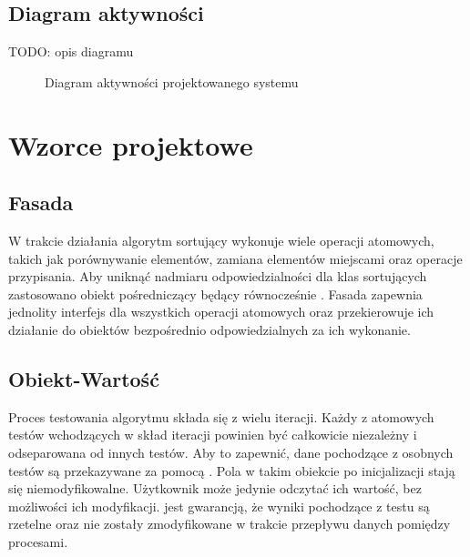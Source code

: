 \subsection{Diagram aktywności}
TODO: opis diagramu

\begin{figure}[H]
	\centering
	\qquad
	\caption{Diagram aktywności projektowanego systemu}
\end{figure}

\section{Wzorce projektowe}

\subsection{Fasada}
W trakcie działania algorytm sortujący wykonuje wiele operacji atomowych, takich jak porównywanie
elementów, zamiana elementów miejscami oraz operacje przypisania. Aby uniknąć nadmiaru odpowiedzialności
dla klas sortujących zastosowano obiekt pośredniczący  będący równocześnie .
Fasada zapewnia jednolity interfejs dla wszystkich operacji atomowych oraz przekierowuje ich działanie
do obiektów bezpośrednio odpowiedzialnych za ich wykonanie.

\begin{figure}[H]
	\centering
	
\end{figure}

\subsection{Obiekt-Wartość}
Proces testowania algorytmu składa się z wielu iteracji. Każdy z atomowych testów wchodzących w skład
iteracji powinien być całkowicie niezależny i odseparowana od innych testów. Aby to zapewnić, dane pochodzące
z osobnych testów są przekazywane za pomocą . Pola w takim obiekcie po
inicjalizacji stają się niemodyfikowalne. Użytkownik może jedynie odczytać ich wartość, bez możliwości ich modyfikacji.  jest gwarancją, że wyniki pochodzące z testu są rzetelne oraz nie zostały
zmodyfikowane w trakcie przepływu danych pomiędzy procesami.

